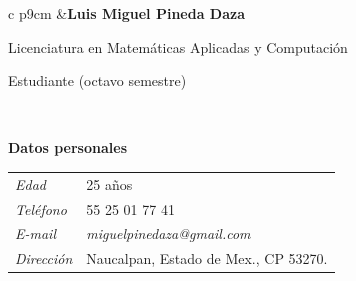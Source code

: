 \documentclass[10pt]{article}
\begin{document}
\pagestyle{empty}
\thispagestyle{empty}


\begin{tabular}{c p{9cm} }
&{\Large \textbf{Luis Miguel Pineda Daza}}

Licenciatura en Matemáticas Aplicadas y Computación 

Estudiante (octavo semestre)

\ 

{\large \textbf{Datos personales}}


\begin{tabular}{p{3cm} l}


\emph{Edad}&25 a\~nos\\

\emph{Tel\'efono} &55 25 01 77 41\\

\emph{E-mail}&
\textit{miguelpinedaza@gmail.com}\\

\emph{Direcci\'on}&Naucalpan, Estado de
Mex., CP 53270. \\



\end{tabular}
\end{tabular}
\\
\\
\\

\ 
\end{document}
